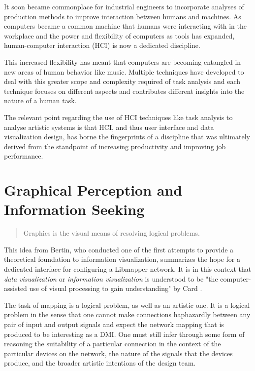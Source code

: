 It soon became commonplace for industrial engineers to incorporate analyses of production methods to improve interaction between humans and machines. As computers became a common machine that humans were interacting with in the workplace and the power and flexibility of computers as tools has expanded, human-computer interaction (HCI) is now a dedicated discipline. 

This increased flexibility has meant that computers are becoming entangled in new areas of human behavior like music. Multiple techniques have developed to deal with this greater scope and complexity required of task analysis and each technique focuses on different aspects and contributes different insights into the nature of a human task.

The relevant point regarding the use of HCI techniques like task analysis to analyse artistic systems is that HCI, and thus user interface and data visualization design, has borne the fingerprints of a discipline that was ultimately derived from the standpoint of increasing productivity and improving job performance. 

\section{Graphical Perception and Information Seeking}

\begin{quote}
Graphics is the visual means of resolving logical problems. \cite{bertin1981}
\end{quote}

This idea from Bertin, who conducted one of the first attempts to provide a theoretical foundation to information visualization, summarizes the hope for a dedicated interface for configuring a Libmapper network. It is in this context that \emph{data visualization} or \emph{information visualization} is understood to be "the computer-assisted use of visual processing to gain understanding" by Card \cite{card1997}. 

The task of mapping is a logical problem, as well as an artistic one. It is a logical problem in the sense that one cannot make connections haphazardly between any pair of input and output signals and expect the network mapping that is produced to be interesting as a DMI. One must still infer through some form of reasoning the suitability of a particular connection in the context of the particular devices on the network, the nature of the signals that the devices produce, and the broader artistic intentions of the design team. 

